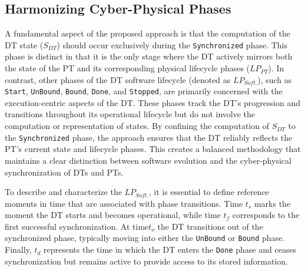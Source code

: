\subsection{Harmonizing Cyber-Physical Phases}
\label{sec:harmonizing_cp_phases}


A fundamental aspect of the proposed approach is that the computation of the DT state ($S_{DT}$) should occur exclusively during the \texttt{Synchronized} phase.
This phase is distinct in that it is the only stage where the DT actively mirrors both the state of the PT and its corresponding physical lifecycle phases ($LP_{PT}$).
In contrast, other phases of the DT software lifecycle (denoted as $LP_{Soft.}$), such as \texttt{Start}, \texttt{UnBound}, \texttt{Bound}, \texttt{Done}, and \texttt{Stopped}, are primarily concerned with the execution-centric aspects of the DT.
These phases track the DT's progression and transitions throughout its operational lifecycle but do not involve the computation or representation of states.
By confining the computation of $S_{DT}$ to the \texttt{Synchronized} phase, the approach ensures that the DT reliably reflects the PT’s current state and lifecycle phases. This creates a balanced methodology that maintains a clear distinction between software evolution and the cyber-physical synchronization of DTs and PTs. 

To describe and characterize the $LP_{Soft.}$, it is essential to define reference moments in time that are associated with phase transitions.
%
Time $t_s$ marks the moment the DT starts and becomes operational, while time $t_f$ corresponds to the first successful synchronization. At time$t_o$ the DT transitions out of the synchronized phase, typically moving into either the \texttt{UnBound} or \texttt{Bound} phase. Finally, $t_d$ represents the time in which the DT enters the \texttt{Done} phase and ceases synchronization but remains active to provide access to its stored information.

